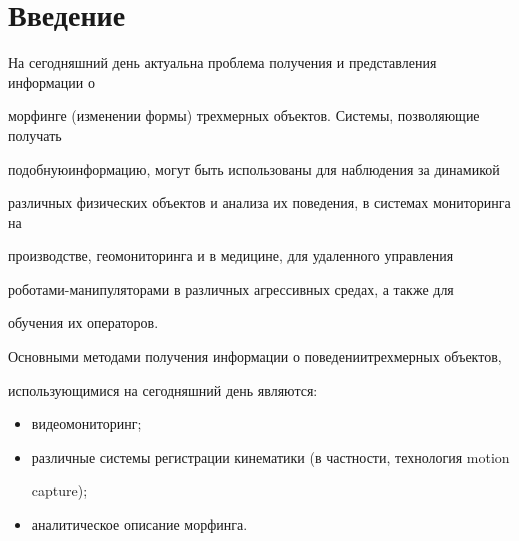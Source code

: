 




 \thispagestyle{empty}





\section{Введение}





На сегодняшний день актуальна проблема получения и представления информации о 


морфинге (изменении формы) трех\-мер\-ных объектов. Системы, позволяющие получать 


подобную\linebreak информа\-цию, могут быть использованы для наблюдения за динамикой 


различных физических объектов и анализа их поведения,  в системах мониторинга на 


производстве, геомониторинга и в медицине, для удаленного управления 


ро\-бо\-та\-ми-ма\-ни\-пу\-ля\-то\-ра\-ми в различных агрессивных средах, а также для 


обучения их операторов.





Основными методами получения информации о поведении\linebreak трехмерных объектов, 


использующимися на сегодняшний день являются:


\begin{itemize}


\item видеомониторинг;


\item различные системы регистрации кинематики (в частности, технология motion 


capture);


\item аналитическое описание морфинга.


\end{itemize}





